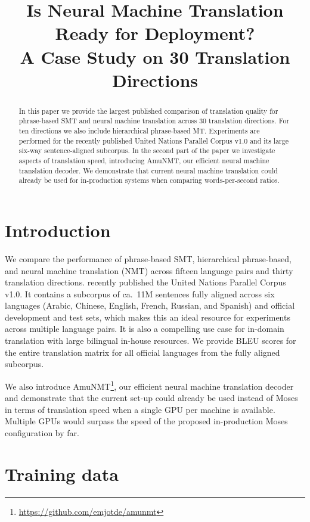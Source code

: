 \documentclass[11pt]{article}
\title{Is Neural Machine Translation Ready for Deployment? \\ A Case Study on 30 Translation Directions}
\date{}
\begin{document}
 \maketitle
\begin{abstract}
In this paper we provide the largest published comparison of translation quality for phrase-based SMT and neural machine translation across 30 translation directions. For ten directions we also include hierarchical phrase-based MT. Experiments are performed for the recently published United Nations Parallel Corpus v1.0 and its large six-way sentence-aligned subcorpus. 
In the second part of the paper we investigate aspects of translation speed, introducing AmuNMT, our efficient neural machine translation decoder. We demonstrate that current neural machine translation could already be used for in-production systems when comparing words-per-second ratios.

\end{abstract}

\section{Introduction}

We compare the performance of phrase-based SMT, hierarchical phrase-based, and neural machine translation (NMT) across fifteen language pairs and thirty translation directions. \cite{ZIEMSKI16.1195} recently published the United Nations Parallel Corpus v1.0. It contains a subcorpus of ca.~11M sentences fully aligned across six languages (Arabic, Chinese, English, French, Russian, and Spanish) and official development and test sets, which makes this an ideal resource for experiments across multiple language pairs. It is also a compelling use case for in-domain translation with large bilingual in-house resources. We provide BLEU scores for the entire translation matrix for all official languages from the fully aligned subcorpus. 

We also introduce AmuNMT\footnote{\url{https://github.com/emjotde/amunmt}}, our efficient neural machine translation decoder and demonstrate that the current set-up could already be used instead of Moses in terms of translation speed when a single GPU per machine is available. Multiple GPUs would surpass the speed of the proposed in-production Moses configuration by far. 

\section{Training data}
\end{document}
